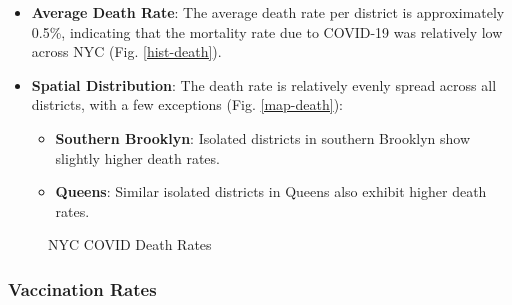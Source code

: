 \documentclass[10pt,journal,compsoc]{IEEEtran}
\begin{document}
\begin{itemize}
    \item \textbf{Average Death Rate}: The average death rate per district is approximately 0.5\%, indicating that the mortality rate due to COVID-19 was relatively low across NYC (Fig. \ref{hist-death}).
    \item \textbf{Spatial Distribution}: The death rate is relatively evenly spread across all districts, with a few exceptions (Fig. \ref{map-death}):
    \begin{itemize}
        \item \textbf{Southern Brooklyn}: Isolated districts in southern Brooklyn show slightly higher death rates.
        \item \textbf{Queens}: Similar isolated districts in Queens also exhibit higher death rates.
    \end{itemize}
\end{itemize}

\begin{figure}[t]
    \centering
    \caption{NYC COVID Death Rates}
\end{figure}

\subsubsection{Vaccination Rates}
\end{document}
